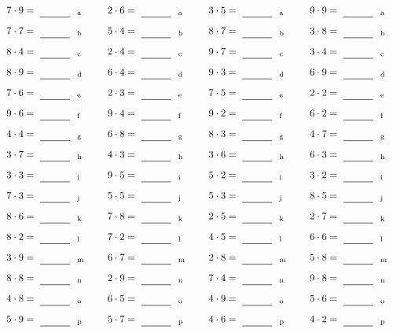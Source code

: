 \documentclass
[
  draft    = true,
  fontsize = 11pt,
  parskip  = half-
]
{scrartcl}
\begin{document}
\par\vfill\par
\begin{align*}
    \pline{7\cdot9}&=\rline{a}
  & \pline{2\cdot6}&=\rline{a}
  & \pline{3\cdot5}&=\rline{a}
  & \pline{9\cdot9}&=\rline{a} \\[1ex]
    \pline{7\cdot7}&=\rline{b}
  & \pline{5\cdot4}&=\rline{b}
  & \pline{8\cdot7}&=\rline{b}
  & \pline{3\cdot8}&=\rline{b} \\[1ex]
    \pline{8\cdot4}&=\rline{c}
  & \pline{2\cdot4}&=\rline{c}
  & \pline{9\cdot7}&=\rline{c}
  & \pline{3\cdot4}&=\rline{c} \\[1ex]
    \pline{8\cdot9}&=\rline{d}
  & \pline{6\cdot4}&=\rline{d}
  & \pline{9\cdot3}&=\rline{d}
  & \pline{6\cdot9}&=\rline{d} \\[1ex]
    \pline{7\cdot6}&=\rline{e}
  & \pline{2\cdot3}&=\rline{e}
  & \pline{7\cdot5}&=\rline{e}
  & \pline{2\cdot2}&=\rline{e} \\[1ex]
    \pline{9\cdot6}&=\rline{f}
  & \pline{9\cdot4}&=\rline{f}
  & \pline{9\cdot2}&=\rline{f}
  & \pline{6\cdot2}&=\rline{f} \\[1ex]
    \pline{4\cdot4}&=\rline{g}
  & \pline{6\cdot8}&=\rline{g}
  & \pline{8\cdot3}&=\rline{g}
  & \pline{4\cdot7}&=\rline{g} \\[1ex]
    \pline{3\cdot7}&=\rline{h}
  & \pline{4\cdot3}&=\rline{h}
  & \pline{3\cdot6}&=\rline{h}
  & \pline{6\cdot3}&=\rline{h} \\[1ex]
    \pline{3\cdot3}&=\rline{i}
  & \pline{9\cdot5}&=\rline{i}
  & \pline{5\cdot2}&=\rline{i}
  & \pline{3\cdot2}&=\rline{i} \\[1ex]
    \pline{7\cdot3}&=\rline{j}
  & \pline{5\cdot5}&=\rline{j}
  & \pline{5\cdot3}&=\rline{j}
  & \pline{8\cdot5}&=\rline{j} \\[1ex]
    \pline{8\cdot6}&=\rline{k}
  & \pline{7\cdot8}&=\rline{k}
  & \pline{2\cdot5}&=\rline{k}
  & \pline{2\cdot7}&=\rline{k} \\[1ex]
    \pline{8\cdot2}&=\rline{l}
  & \pline{7\cdot2}&=\rline{l}
  & \pline{4\cdot5}&=\rline{l}
  & \pline{6\cdot6}&=\rline{l} \\[1ex]
    \pline{3\cdot9}&=\rline{m}
  & \pline{6\cdot7}&=\rline{m}
  & \pline{2\cdot8}&=\rline{m}
  & \pline{5\cdot8}&=\rline{m} \\[1ex]
    \pline{8\cdot8}&=\rline{n}
  & \pline{2\cdot9}&=\rline{n}
  & \pline{7\cdot4}&=\rline{n}
  & \pline{9\cdot8}&=\rline{n} \\[1ex]
    \pline{4\cdot8}&=\rline{o}
  & \pline{6\cdot5}&=\rline{o}
  & \pline{4\cdot9}&=\rline{o}
  & \pline{5\cdot6}&=\rline{o} \\[1ex]
    \pline{5\cdot9}&=\rline{p}
  & \pline{5\cdot7}&=\rline{p}
  & \pline{4\cdot6}&=\rline{p}
  & \pline{4\cdot2}&=\rline{p}
\end{align*}
\end{document}
